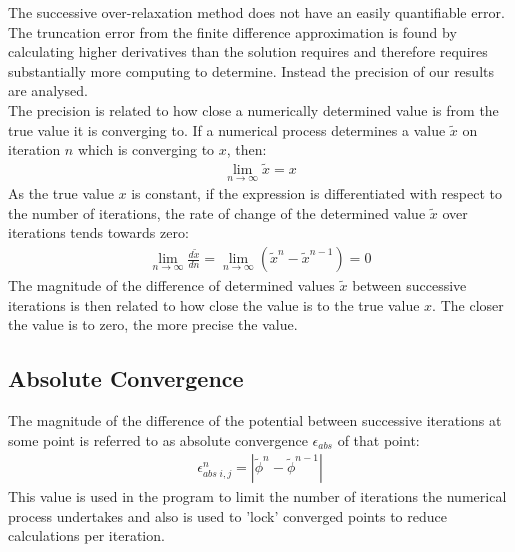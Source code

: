 The successive over-relaxation method does not have an easily quantifiable error. The truncation error from the finite difference approximation is found by calculating higher derivatives than the solution requires and therefore requires substantially more computing to determine. Instead the precision of our results are analysed.
\\
The precision is related to how close a numerically determined value is from the true value it is converging to. If a numerical process determines a value $\tilde{x}$ on iteration $n$ which is converging to $x$, then:
\begin{align}
\lim_{n \rightarrow \infty}\tilde{x} = x                     
\end{align}
As the true value $x$ is constant, if the expression is differentiated with respect to the number of iterations, the rate of change of the determined value $\tilde{x}$ over iterations tends towards zero:
\begin{align}
\lim_{n \rightarrow \infty}\frac{d\tilde{x}}{dn} = \lim_{n \rightarrow \infty} (\tilde{x}^{n} - \tilde{x}^{n-1}) = 0                     
\end{align}
The magnitude of the difference of determined values $\tilde{x}$ between successive iterations is then related to how close the value is to the true value $x$. The closer the value is to zero, the more precise the value.
\subsection{Absolute Convergence}
The magnitude of the difference of the potential between successive iterations at some point is referred to as absolute convergence $\epsilon_{abs}$ of that point:
\begin{align}
\epsilon_{abs \; i,j}^{n} = |\tilde{\phi}^{n} - \tilde{\phi}^{n-1}|
\end{align}
This value is used in the program to limit the number of iterations the numerical process undertakes and also is used to 'lock' converged points to reduce calculations per iteration.
